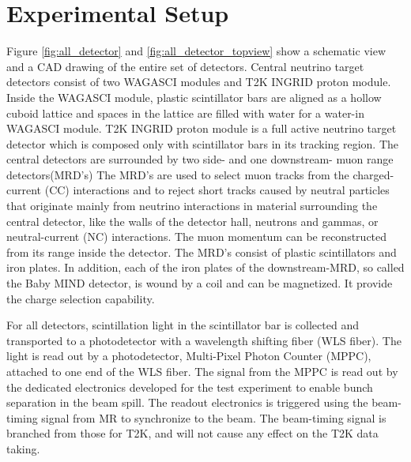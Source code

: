 \section{Experimental Setup}
Figure \ref{fig:all_detector} and \ref{fig:all_detector_topview} show a schematic view and a CAD drawing of the entire set of detectors.
Central neutrino target detectors consist of two WAGASCI modules and T2K INGRID proton module. 
Inside the WAGASCI module, plastic scintillator bars are aligned as a hollow cuboid lattice
and spaces in the lattice are filled with water for a water-in WAGASCI module.
T2K INGRID proton module is a full active neutrino target detector which is composed only with scintillator bars in its tracking region. 
The central detectors are surrounded by two side- and one downstream- muon range detectors(MRD's)
The MRD's are used to select muon tracks from the charged-current (CC) interactions 
and to reject short tracks caused by neutral particles 
that originate mainly from neutrino interactions in material surrounding the central detector, like the walls of the detector hall,
neutrons and gammas, or neutral-current (NC) interactions.
The muon momentum can be reconstructed from its range inside the detector.
The MRD's consist of plastic scintillators and iron plates.
In addition, each of the iron plates of the downstream-MRD, so called the Baby MIND detector, is wound by a coil and
can be magnetized. It provide the charge selection capability.


For all detectors, scintillation light in the scintillator bar is collected and transported to a photodetector with a wavelength shifting fiber (WLS fiber).
The light is read out by a photodetector, Multi-Pixel Photon Counter (MPPC), attached to one end of the WLS fiber.
The signal from the MPPC is read out by the dedicated electronics developed for the test experiment
to enable bunch separation in the beam spill.
The readout electronics is triggered using the beam-timing signal from MR to synchronize to the beam.
The beam-timing signal is branched from those for T2K, and will not cause any effect on the T2K data taking.

